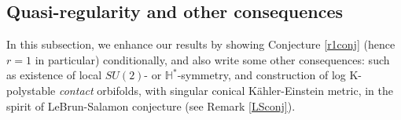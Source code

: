 \documentclass[12pt,a4paper]{amsart}
\theoremstyle{remark}
\theoremstyle{definition}
\begin{document}

\subsection{Quasi-regularity and other 
consequences}\label{subsec:last}

In this subsection, we 
enhance our results by showing 
Conjecture \ref{r1conj} (hence $r=1$ in 
particular) conditionally, and also 
write 
some other consequences: such as  
existence of local 
$SU(2)$- or $\mathbb{H}^*$-symmetry, and construction of log K-polystable 
{\it contact} orbifolds, 
with singular conical K\"ahler-Einstein metric, 
in the spirit of 
LeBrun-Salamon conjecture (see Remark 
\ref{LSconj}). 
\end{document}
